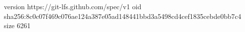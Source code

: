 version https://git-lfs.github.com/spec/v1
oid sha256:8c0c07f469c076ae124a387e05ad148441bbd3a5498cd4cef1835cebde0bb7c4
size 6261
